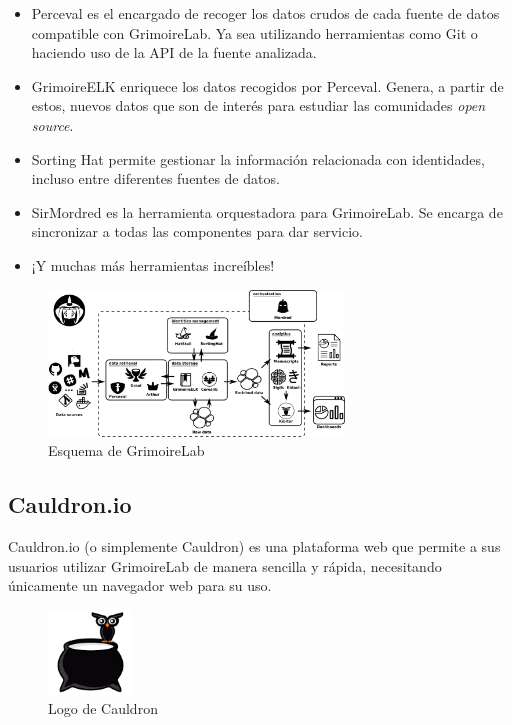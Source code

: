 \begin{itemize}
    \item Perceval es el encargado de recoger los datos crudos de cada fuente de datos compatible con GrimoireLab. Ya sea utilizando herramientas como Git o haciendo uso de la API de la fuente analizada.
    \item GrimoireELK enriquece los datos recogidos por Perceval. Genera, a partir de estos, nuevos datos que son de interés para estudiar las comunidades \emph{open source}.
    \item Sorting Hat permite gestionar la información relacionada con identidades, incluso entre diferentes fuentes de datos.
    \item SirMordred es la herramienta orquestadora para GrimoireLab. Se encarga de sincronizar a todas las componentes para dar servicio.
    \item ¡Y muchas más herramientas increíbles!
\end{itemize}

\begin{figure}[ht]
    \centering
    \includegraphics[width=0.7\textwidth]{Figures/grimoirelab-schema}
    \decoRule
    \caption[GrimoireLab (Esquema)]{Esquema de GrimoireLab \emph{\parencite{Reference12}}}
    \label{fig:grimoirelab-schema}
\end{figure}

\subsection{Cauldron.io}

Cauldron.io (o simplemente Cauldron) es una plataforma web que permite a sus usuarios utilizar GrimoireLab de manera sencilla y rápida, necesitando únicamente un navegador web para su uso. \emph{\parencite{Reference13}}

\begin{figure}[ht]
    \centering
    \includegraphics[width=0.2\textwidth]{Figures/cauldron-logo}
    \decoRule
    \caption[Cauldron (Logo)]{Logo de Cauldron \emph{\parencite{Reference13}}}
    \label{fig:cauldron-logo}
\end{figure}

